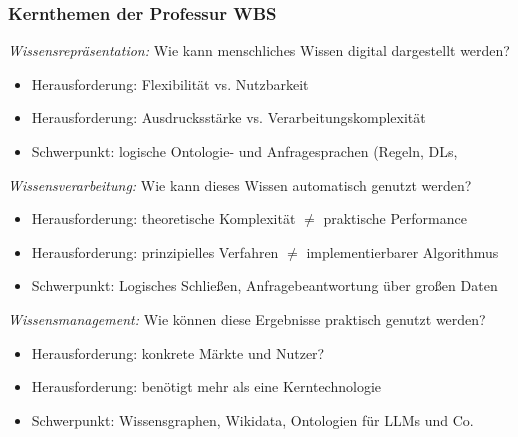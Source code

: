 \documentclass[aspectratio=1610,onlymath]{beamer}
\begin{document}
\begin{frame}\frametitle{Kernthemen der Professur WBS}\pause

\emph{Wissensrepräsentation:} \alert{Wie kann menschliches Wissen digital dargestellt werden?}
\begin{itemize}
\item Herausforderung: Flexibilität vs. Nutzbarkeit
\item Herausforderung: Ausdrucksstärke vs. Verarbeitungskomplexität
\item Schwerpunkt: logische Ontologie- und Anfragesprachen (Regeln, DLs, 
\end{itemize}\medskip\pause

\emph{Wissensverarbeitung:} \alert{Wie kann dieses Wissen automatisch genutzt werden?}
\begin{itemize}
\item Herausforderung: theoretische Komplexität $\neq$ praktische Performance
\item Herausforderung: prinzipielles Verfahren $\neq$ implementierbarer Algorithmus
\item Schwerpunkt: Logisches Schließen, Anfragebeantwortung über großen Daten
\end{itemize}\medskip\pause

\emph{Wissensmanagement:} \alert{Wie können diese Ergebnisse praktisch genutzt werden?}
\begin{itemize}
\item Herausforderung: konkrete Märkte und Nutzer?
\item Herausforderung: benötigt mehr als eine Kerntechnologie
\item Schwerpunkt: Wissensgraphen, Wikidata, Ontologien für LLMs und Co.
\end{itemize}

\end{frame}
\end{document}
